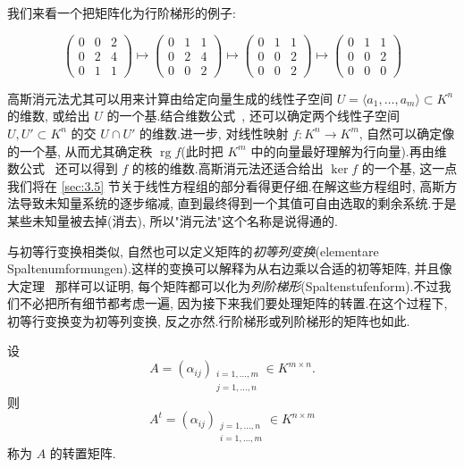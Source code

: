 我们来看一个把矩阵化为行阶梯形的例子:

\[
\begin{pmatrix} 0 & 0 & 2 \\ 0 & 2 & 4 \\ 0 & 1 & 1 \end{pmatrix}
\longmapsto
\begin{pmatrix} 0 & 1 & 1 \\ 0 & 2 & 4 \\ 0 & 0 & 2 \end{pmatrix}
\longmapsto
\begin{pmatrix} 0 & 1 & 1 \\ 0 & 0 & 2 \\ 0 & 0 & 2 \end{pmatrix}
\longmapsto
\begin{pmatrix} 0 & 1 & 1 \\ 0 & 0 & 2 \\ 0 & 0 & 0 \end{pmatrix}
\]

高斯消元法尤其可以用来计算由给定向量生成的线性子空间 $U = \langle a_1, \ldots, a_m \rangle \subset K^n$ 的维数, 或给出 $U$ 的一个基.结合维数公式~, 还可以确定两个线性子空间 $U, U' \subset K^n$ 的交 $U \cap U'$ 的维数.进一步, 对线性映射 $f \colon K^n \longrightarrow K^m$, 自然可以确定像的一个基, 从而尤其确定秩 $\operatorname{rg} f$(此时把 $K^m$ 中的向量最好理解为行向量).再由维数公式~ 还可以得到 $f$ 的核的维数.高斯消元法还适合给出 $\ker f$ 的一个基, 这一点我们将在 \ref{sec:3.5} 节关于线性方程组的部分看得更仔细.在解这些方程组时, 高斯方法导致未知量系统的逐步缩减, 直到最终得到一个其值可自由选取的剩余系统.于是某些未知量被去掉(消去), 所以"消元法"这个名称是说得通的.

与初等行变换相类似, 自然也可以定义矩阵的\emph{初等列变换}(\textup{elementare Spaltenumformungen}).这样的变换可以解释为从右边乘以合适的初等矩阵, 并且像大定理~ 那样可以证明, 每个矩阵都可以化为\emph{列阶梯形}(\textup{Spaltenstufenform}).不过我们不必把所有细节都考虑一遍, 因为接下来我们要处理矩阵的转置.在这个过程下, 初等行变换变为初等列变换, 反之亦然.行阶梯形或列阶梯形的矩阵也如此.

\begin{definition}\label{def:3.2.5}
设
\[
A = (\alpha_{ij})_{\substack{i = 1, \ldots, m\\ j = 1, \ldots, n}} \in K^{m \times n}\text{.}
\]
则
\[
A^t = (\alpha_{ij})_{\substack{j = 1, \ldots, n\\ i = 1, \ldots, m}} \in K^{n \times m}
\]
称为 $A$ 的转置矩阵.
\end{definition}

